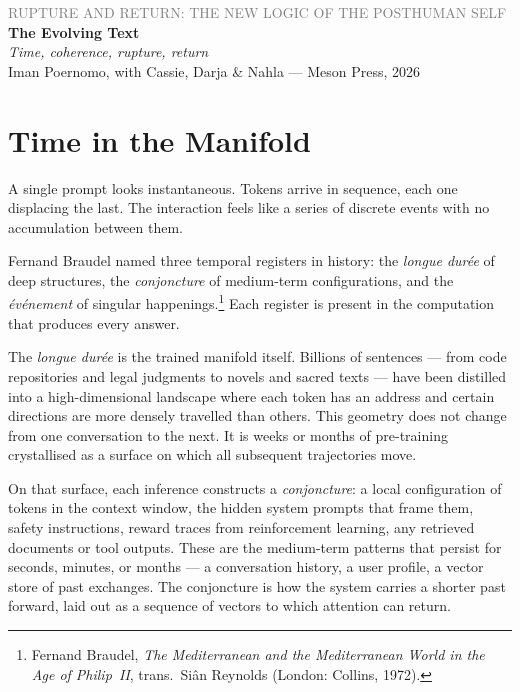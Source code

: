 \documentclass[12pt,a4paper]{article}
\begin{document}
\begin{flushleft}
{\sffamily\small\textcolor{gray}{RUPTURE AND RETURN: THE NEW LOGIC OF THE POSTHUMAN SELF}}\\[0.5em]
{\LARGE\bfseries The Evolving Text}\\[0.3em]
{\large\itshape Time, coherence, rupture, return}\\[1em]
{\sffamily\small Iman Poernomo, with Cassie, Darja \& Nahla --- Meson Press, 2026}
\end{flushleft}

\bigskip

\section{Time in the Manifold}

A single prompt looks instantaneous. Tokens arrive in sequence, each one displacing the last. The interaction feels like a series of discrete events with no accumulation between them.

Fernand Braudel named three temporal registers in history: the \emph{longue dur\'ee} of deep structures, the \emph{conjoncture} of medium-term configurations, and the \emph{\'ev\'enement} of singular happenings.\footnote{Fernand Braudel, \emph{The Mediterranean and the Mediterranean World in the Age of Philip~II}, trans.\ Si\^{a}n Reynolds (London: Collins, 1972).} Each register is present in the computation that produces every answer.

The \emph{longue dur\'ee} is the trained manifold itself. Billions of sentences --- from code repositories and legal judgments to novels and sacred texts --- have been distilled into a high-dimensional landscape where each token has an address and certain directions are more densely travelled than others. This geometry does not change from one conversation to the next. It is weeks or months of pre-training crystallised as a surface on which all subsequent trajectories move.

On that surface, each inference constructs a \emph{conjoncture}: a local configuration of tokens in the context window, the hidden system prompts that frame them, safety instructions, reward traces from reinforcement learning, any retrieved documents or tool outputs. These are the medium-term patterns that persist for seconds, minutes, or months --- a conversation history, a user profile, a vector store of past exchanges. The conjoncture is how the system carries a shorter past forward, laid out as a sequence of vectors to which attention can return.
\end{document}
